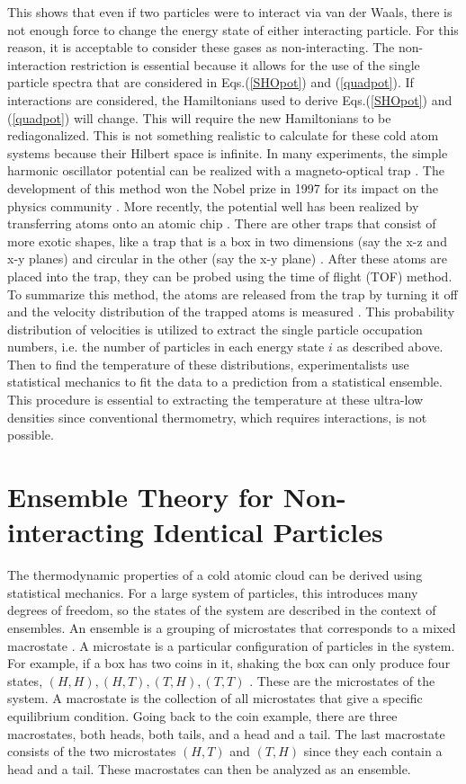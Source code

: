 This shows that even if two particles were to interact via van der Waals, there is not enough force to change the energy state of either interacting particle. For this reason, it is acceptable to consider these gases as non-interacting. 
The non-interaction restriction is essential because it allows for the use of the single particle spectra that are considered in Eqs.\@ (\ref{SHOpot}) and (\ref{quadpot}). 
If interactions are considered, the Hamiltonians used to derive Eqs.\@ (\ref{SHOpot}) and (\ref{quadpot}) will change. 
This will require the new Hamiltonians to be rediagonalized. 
This is not something realistic to calculate for these cold atom systems because their Hilbert space is infinite. 
In many experiments, the simple harmonic oscillator potential can be realized with a magneto-optical trap \cite{Bhar, Viering, Radwell,Phillips_1998}. 
The development of this method won the Nobel prize in 1997 for its impact on the physics community \cite{nobelprize.org_1997}. 
More recently, the potential well has been realized by transferring atoms onto an atomic chip \cite{Es2010}. 
There are other traps that consist of more exotic shapes, like a trap that is a box in two dimensions (say the x-z and x-y planes) and circular in the other (say the x-y plane) \cite{Mukherjee2017}. 
After these atoms are placed into the trap, they can be probed using the time of flight (TOF) method. To summarize this method, the atoms are released from the trap by turning it off and the velocity distribution of the trapped atoms is measured \cite{Brzozowski,Wheeler_2003}. This probability distribution of velocities is utilized to extract the single particle occupation numbers, i.e. the number of particles in each energy state $i$ as described above. Then to find the temperature of these distributions, experimentalists use statistical mechanics to fit the data to a prediction from a statistical ensemble. This procedure is essential to extracting the temperature at these ultra-low densities since conventional thermometry, which requires interactions, is not possible. 


\section{Ensemble Theory for Non-interacting Identical Particles}
The thermodynamic properties of a cold atomic cloud can be derived using statistical mechanics. For a large system of particles, this introduces many degrees of freedom, so the states of the system are described in the context of ensembles. 
An ensemble is a grouping of microstates that corresponds to a mixed macrostate \cite{Kardar}. A microstate is a particular configuration of particles in the system. For example, if a box has two coins in it, shaking the box can only produce four states, $(H,H),(H,T),(T,H),(T,T)$ \cite{Blundell}. These are the microstates of the system.
A macrostate is the collection of all microstates that give a specific equilibrium condition. Going back to the coin example, there are three macrostates, both heads, both tails, and a head and a tail. The last macrostate consists of the two microstates $(H,T)$ and $(T,H)$ since they each contain a head and a tail. These macrostates can then be analyzed as an ensemble. 

